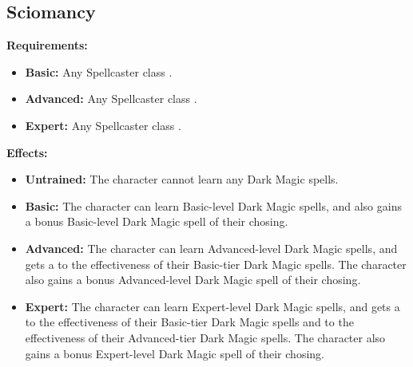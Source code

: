\documentclass[openany,10pt,a4paper]{book}
\begin{document}
\subsection{Sciomancy}
\begin{table}[!ht]
\centering
{}
\end{table}
\textbf{Requirements:}
\begin{itemize}
	\item \textbf{Basic:} Any Spellcaster class .
	\item \textbf{Advanced:} Any Spellcaster class .
	\item \textbf{Expert:} Any Spellcaster class .
\end{itemize}
\textbf{Effects:}
\begin{itemize}
	\item \textbf{Untrained:} The character cannot learn any Dark Magic spells.
	\item \textbf{Basic:} The character can learn Basic-level Dark Magic spells, and also gains a bonus Basic-level Dark Magic spell of their chosing.
	\item \textbf{Advanced:} The character can learn Advanced-level Dark Magic spells, and gets a  to the effectiveness of their Basic-tier Dark Magic spells. The character also gains a bonus Advanced-level Dark Magic spell of their chosing.
	\item \textbf{Expert:} The character can learn Expert-level Dark Magic spells, and gets a  to the effectiveness of their Basic-tier Dark Magic spells and  to the effectiveness of their Advanced-tier Dark Magic spells. The character also gains a bonus Expert-level Dark Magic spell of their chosing.
\end{itemize}\newpage
\end{document}
